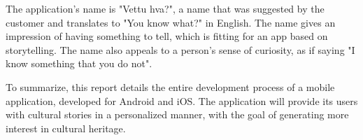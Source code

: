 The application's name is "Vettu hva?", a name that was suggested by the customer and translates to "You know what?" in English. The name gives an impression of having something to tell, which is fitting for an app based on storytelling. The name also appeals to a person's sense of curiosity, as if saying "I know something that you do not".\newline

To summarize, this report details the entire development process of a mobile application, developed for Android and iOS. The application will provide its users with cultural stories in a personalized manner, with the goal of generating more interest in cultural heritage.

\cleardoublepage